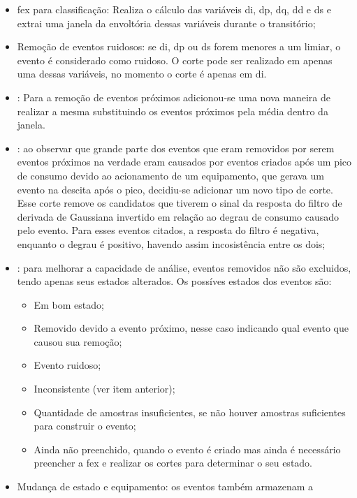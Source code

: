 \begin{itemize}
\item \acs{fex} para classificação: Realiza o cálculo das variáveis
\acs{di}, \acs{dp}, \acs{dq}, \acs{dd} e \acs{ds} e extrai uma janela
da envoltória dessas variáveis durante o transitório;
\item Remoção de eventos ruidosos: se \acs{di}, \acs{dp} ou \acs{ds}
forem menores a um limiar, o evento é considerado como ruidoso. O
corte pode ser realizado em apenas uma dessas variáveis, no momento o
corte é apenas em \acs{di}.
\item {}: Para a remoção de eventos próximos
adicionou-se uma nova maneira de realizar a mesma substituindo os
eventos próximos pela média dentro da janela.
\item {}: 
ao observar que grande parte
dos eventos que eram removidos por serem eventos próximos na verdade
eram causados por eventos criados após um pico de consumo devido ao
acionamento de um equipamento, que gerava um evento na descita após o
pico, decidiu-se adicionar um novo tipo de corte. Esse corte remove os
candidatos que tiverem o sinal da resposta do filtro de derivada de
Gaussiana invertido em relação ao degrau de consumo causado pelo
evento. Para esses eventos citados, a resposta do filtro é negativa,
enquanto o degrau é positivo, havendo assim incosistência entre os
dois;
\item {}: para
melhorar a capacidade de análise, eventos removidos não são excluidos,
tendo apenas seus estados alterados. Os possíves estados dos eventos
são:
\begin{itemize}
\item Em bom estado;
\item Removido devido a evento próximo, nesse caso indicando qual
evento que causou sua remoção;
\item Evento ruidoso;
\item Inconsistente (ver item anterior);
\item Quantidade de amostras insuficientes, se não houver amostras
suficientes para construir o evento;
\item Ainda não preenchido, quando o evento é criado mas ainda é
necessário preencher a \gls{fex} e realizar os cortes para determinar
o seu estado.
\end{itemize}
\item Mudança de estado e equipamento: os eventos também armazenam a

\end{itemize}
